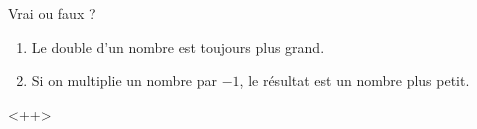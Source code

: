
\begin{exercice}\label{exosmath-0760}

    Vrai ou faux ?
    \begin{enumerate}
        \item
            Le double d'un nombre est toujours plus grand.
        \item
            Si on multiplie un nombre par $-1$, le résultat est un nombre plus petit.
    \end{enumerate}
    <++>

\end{exercice}
